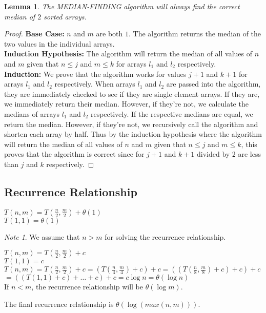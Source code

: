 \documentclass{article}
\theoremstyle{definition}
\theoremstyle{remark}
\newtheorem{note}{Note}[section]
\theoremstyle{plain}
\newtheorem{lem}[thm]{Lemma}
\begin{document}
\begin{lem}
The MEDIAN-FINDING algorithm will always find the correct median of $2$ sorted arrays.
\end{lem}
\begin{proof}
\textbf{Base Case:} $n$ and $m$ are both $1$. The algorithm returns the median of the two values in the individual arrays.\\
\textbf{Induction Hypothesis:} The algorithm will return the median of all values of $n$ and $m$ given that $n \leq j$ and $m \leq k$ for arrays $l_1$ and $l_2$ respectively.\\
\textbf{Induction:} We prove that the algorithm works for values $j+1$ and $k+1$ for arrays $l_1$ and $l_2$ respectively.
When arrays $l_1$ and $l_2$ are passed into the algorithm, they are immediately checked to see if they are single element arrays. If they are, we immediately return their median. However, if they're not, we calculate the medians of arrays $l_1$ and $l_2$ respectively. If the respective medians are equal, we return the median. However, if they're not, we recursively call the algorithm and shorten each array by half. Thus by the induction hypothesis where the algorithm will return the median of all values of $n$ and $m$ given that $n \leq j$ and $m \leq k$, this proves that the algorithm is correct since for $j+1$ and $k+1$ divided by 2 are less than $j$ and $k$ respectively.
\end{proof}

\subsection{Recurrence Relationship}
$T(n,m) = T(\frac {n}{2}, \frac {m}{2}) + \theta(1)$\\
$T(1,1) = \theta(1)$\\

\begin{note}
We assume that $n > m$ for solving the recurrence relationship.
\end{note}

$T(n,m) = T(\frac {n}{2}, \frac {m}{2}) + c$\\
$T(1,1) = c$\\

$T(n,m) = T(\frac {n}{2}, \frac {m}{2}) + c = (T(\frac {n}{4}, \frac {m}{4}) + c) + c = ((T(\frac {n}{8}, \frac {m}{8}) + c) + c) + c$ 
$= ((T(1,1) + c) + \ldots + c) + c = c \log n = \theta(\log n)$\\

If $n < m$, the recurrence relationship will be $\theta(\log m)$.

The final recurrence relationship is $\theta(\log (max(n, m)))$.
\end{document}
